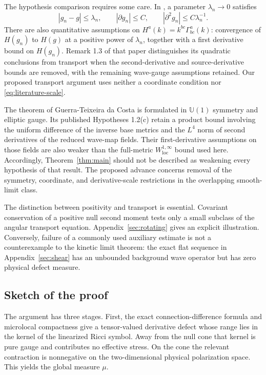 \documentclass[11pt,a4paper]{article}
\numberwithin{equation}{section}
\newcommand{\loc}{\mathrm{loc}}
\theoremstyle{definition}
\begin{document}
The hypothesis comparison requires some care. In
\cite[Assumptions 1.2]{HLwave}, a parameter $\lambda_n\to0$ satisfies
\begin{equation}\label{eq:literature-scale}
|g_n-g|\leq\lambda_n,\qquad |\partial g_n|\leq C,
\qquad |\partial^2g_n|\leq C\lambda_n^{-1}.
\end{equation}
There are also quantitative assumptions on
$H^a(k)=k^{bc}\Gamma^a_{bc}(k)$: convergence of $H(g_n)$ to $H(g)$ at a
positive power of $\lambda_n$, together with a first derivative bound
on $H(g_n)$. Remark 1.3 of that paper distinguishes its quadratic
conclusions from transport when the second-derivative and source-derivative
bounds are removed, with the remaining wave-gauge assumptions retained.
Our proposed transport argument uses neither a
coordinate condition nor \eqref{eq:literature-scale}.

The theorem of Guerra-Teixeira da Costa \cite{GTC} is formulated in
$\mathbb U(1)$ symmetry and elliptic gauge. Its published
Hypotheses 1.2(c) retain a product bound involving the uniform difference
of the inverse base metrics and the $L^4$ norm of second derivatives of
the reduced wave-map fields. Their first-derivative assumptions on those
fields are also weaker than the full-metric $W^{1,\infty}_{\loc}$ bound
used here. Accordingly, Theorem~\ref{thm:main} should not be described as
weakening every hypothesis of that result. The proposed advance concerns
removal of the symmetry, coordinate, and derivative-scale restrictions
in the overlapping smooth-limit class.

The distinction between positivity and transport is essential.
Covariant conservation of a positive null second moment tests only a
small subclass of the angular transport equation. Appendix~\ref{sec:rotating}
gives an explicit illustration. Conversely, failure of a commonly used
auxiliary estimate is not a counterexample to the kinetic limit theorem:
the exact flat sequence in Appendix~\ref{sec:shear} has an unbounded
background wave operator but has zero physical defect measure.

\subsection{Sketch of the proof}

The argument has three stages. First, the exact connection-difference
formula and microlocal compactness give a tensor-valued derivative defect
whose range lies in the kernel of the linearized Ricci symbol. Away from
the null cone that kernel is pure gauge and contributes no effective
stress. On the cone the relevant contraction is nonnegative on the
two-dimensional physical polarization space. This yields the global
measure $\mu$.
\end{document}
